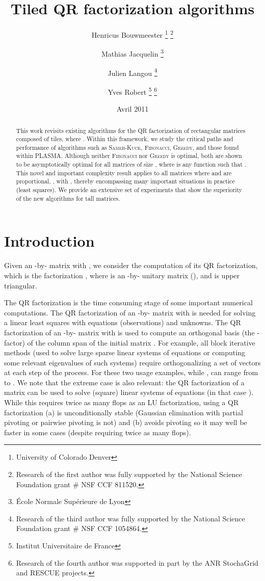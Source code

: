 \documentclass[a4paper,twopages]{article}
\date{Avril 2011}
\author{
  Henricus Bouwmeester
\thanks{University of Colorado Denver}
\thanks{Research of the first author was fully supported by the National Science Foundation grant \# NSF CCF 811520.}
  \and
  Mathias Jacquelin
\thanks{\'Ecole Normale Sup\'erieure de Lyon}
  \and
  Julien Langou
\footnotemark[1]
\thanks{Research of the third author was fully supported by the National Science Foundation grant \# NSF CCF 1054864.}
  \and
  Yves Robert
\footnotemark[3]
\thanks{Institut Universitaire de France}
\thanks{Research of the fourth author was supported in part by the ANR StochaGrid and RESCUE projects.}
}
\title{Tiled QR factorization algorithms}
\newcommand{\SK}{\textsc{Sameh-Kuck}\xspace}
\newcommand{\MC}{\textsc{Fibonacci}\xspace}
\newcommand{\Greedy}{\textsc{Greedy}\xspace}
\begin{document}
\maketitle
\begin{abstract}
        This work revisits existing algorithms for the QR factorization of
    rectangular matrices composed of  tiles, where .
    Within this framework, we study the critical paths and performance of
    algorithms such as \SK, \MC, \Greedy, and those found within PLASMA.
    Although neither \MC nor \Greedy is optimal, both are shown to
    be asymptotically optimal for all matrices of size , where
     is any function such that . This novel and important complexity
    result applies to
    all matrices where  and  are proportional, , with
    , thereby encompassing many important situations in
    practice (least squares). We provide an extensive set of experiments that
    show the superiority of the new algorithms for
    tall matrices.
\end{abstract}


\section{Introduction}
\label{sec.intro}

Given an -by- matrix  with , we consider the computation of
its QR factorization, which is the factorization , where  is an
-by- unitary matrix (), and  is upper triangular.

The QR factorization is the time consuming stage of some important numerical
computations.  The QR factorization of an -by- matrix with  is
needed for solving a linear least squares with  equations (observations) and  unknowns.  The QR factorization of an -by- matrix
with  is used to compute an orthogonal basis (the -factor) of the
column span of the initial matrix .  For example, all block iterative
methods (used to solve large sparse linear systems of equations or computing
some relevant eigenvalues of such systems) require orthogonalizing a set of
vectors at each step of the process. For these two usage examples, while
,  can range from  to . We note that the
extreme case  is also relevant:  the QR factorization of a matrix can be
used to solve (square) linear systems of equations (in that case ). While
this requires twice as many flops as an LU factorization, using a QR
factorization (a) is unconditionally stable (Gaussian elimination with partial
pivoting or pairwise pivoting is not) and (b) avoids pivoting so it may well be
faster in some cases (despite requiring twice as many flops).
\end{document}
